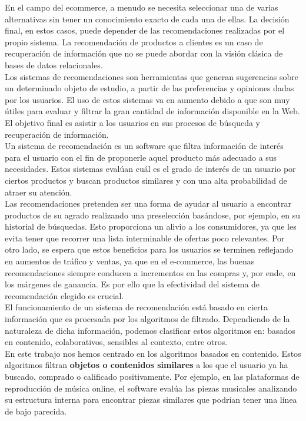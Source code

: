 En el campo del e\-commerce, a menudo se necesita seleccionar una de varias alternativas sin tener un conocimiento exacto de cada una de ellas. La decisi\'on final, en estos casos, puede depender de las recomendaciones realizadas por el propio sistema. La recomendaci\'on de productos a clientes es un caso de recuperaci\'on de informaci\'on que no se puede abordar con la visi\'on cl\'asica de bases de datos relacionales.\\

Los sistemas de recomendaciones son herramientas que generan sugerencias sobre un determinado objeto de estudio, a partir de las preferencias y opiniones dadas por los usuarios. El uso de estos sistemas va en aumento debido a que son muy \'utiles para evaluar y filtrar la gran cantidad  de informaci\'on disponible en la Web. El objetivo final es asistir a los usuarios en sus procesos  de b\'usqueda y recuperaci\'on de informaci\'on.\\
 

Un sistema de recomendaci\'on es un software que filtra informaci\'on de inter\'es para el usuario con el fin de proponerle aquel producto m\'as adecuado a sus necesidades. Estos sistemas eval\'uan cu\'al es el grado de inter\'es de un usuario por ciertos productos y buscan productos similares y con una alta probabilidad de atraer su atenci\'on.\\

Las recomendaciones pretenden ser una forma de ayudar al usuario a encontrar productos de su agrado realizando una preselecci\'on bas\'andose, por ejemplo, en su historial de b\'usquedas. Esto proporciona un alivio a los consumidores, ya que les evita tener que recorrer una lista interminable de ofertas poco relevantes. Por otro lado, se espera que estos beneficios para los usuarios se terminen reflejando en aumentos de tr\'afico y ventas, ya que en el e-commerce, las buenas recomendaciones siempre conducen a incrementos en las compras y, por ende, en los m\'argenes de ganancia. Es por ello que la efectividad del sistema de recomendaci\'on elegido es crucial.\\

El funcionamiento de un sistema de recomendaci\'on est\'a basado en cierta informaci\'on que es procesada por los algoritmos de filtrado. Dependiendo de la naturaleza de dicha informaci\'on, podemos clasificar estos algoritmos en: basados en contenido, colaborativos, sensibles al contexto, entre otros.\\

En este trabajo nos hemos centrado en los algoritmos basados en contenido. Estos algoritmos filtran {\bf objetos o contenidos similares} a los que el usuario ya ha buscado, comprado o calificado positivamente. Por ejemplo, en las plataformas de reproducci\'on de m\'usica online, el software eval\'ua las piezas musicales analizando su estructura interna para encontrar piezas similares que podr\'ian tener una l\'inea de bajo parecida.\\

